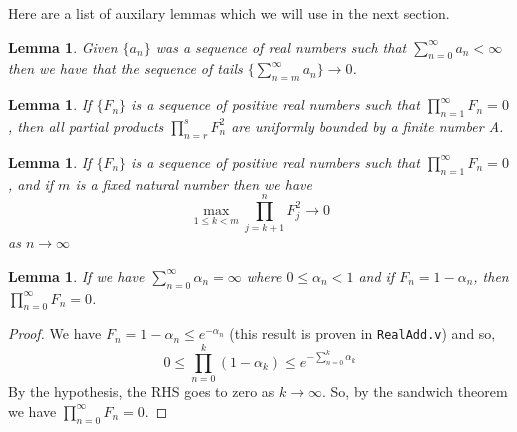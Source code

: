 \documentclass{article}
\newtheorem{lemma}[theorem]{Lemma}
\begin{document}
Here are a list of auxilary lemmas which we will use in the next section.

\begin{lemma}\label{lem:tailszero}
    Given $\{a_n\}$ was a sequence of real numbers such that $\sum_{n=0}^\infty a_n<\infty$ then we have that the sequence of tails
    $\{\sum_{n=m}^\infty a_n\} \rightarrow 0$.
    \end{lemma}
    
    \begin{lemma}\label{lem:partprodbdd}
    If $\{F_n\}$ is a sequence of positive real numbers such that $\prod_{n=1}^{\infty} F_n =0$, then all partial products $\prod_{n=r}^s F_n^2$ are uniformly bounded by a finite number A. 
    \end{lemma}
    
    \begin{lemma}\label{lem:maxzero}
    If $\{F_n\}$ is a sequence of positive real numbers such that $\prod_{n=1}^{\infty} F_n =0$, and if $m$ is a fixed natural number then we have
    \[ \max_{1 \le k < m}\prod_{j=k+1}^n F_j^2  \rightarrow 0 \]
    as $n \rightarrow \infty$
    \end{lemma}
    \begin{lemma}\label{thm:fprod}
        If we have $\sum_{n=0}^\infty \alpha_n = \infty$ where $0 \le \alpha_n < 1$ and if $F_n = 1 - \alpha_n$, then $\prod_{n=0}^\infty F_n = 0$. 
        \end{lemma}
        \begin{proof}
            We have $F_n = 1 - \alpha_n \le e^{-\alpha_n}$ (this result is proven in \texttt {RealAdd.v}) and so,
            \[ 
            0 \le \prod_{n=0}^k (1 - \alpha_k) \le e^{- \sum_{n=0}^k \alpha_k}
            \]
            By the hypothesis, the RHS goes to zero as $k \to \infty$. So, by the sandwich theorem we have $\prod_{n=0}^\infty F_n = 0$. 
        \end{proof}
        
\end{document}
